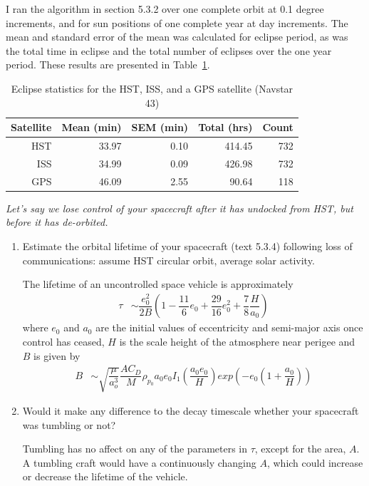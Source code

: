 \documentclass[onecolumn,10pt]{jhwhw}
\begin{document}
I ran the algorithm in section 5.3.2 over one complete orbit at 0.1 degree increments, and for sun positions of one complete year at day increments. The mean and standard error of the mean was calculated for eclipse period, as was the total time in eclipse and the total number of eclipses over the one year period. These results are presented in Table~\ref{p2table}.

\begin{table}[h]
\begin{center}
\begin{tabular}{rrrrr}
\toprule
Satellite & Mean (min) & SEM (min) & Total (hrs) & Count \\
\midrule
HST & 33.97 & 0.10 & 414.45 & 732 \\
ISS & 34.99 & 0.09 & 426.98 & 732 \\
GPS & 46.09 & 2.55 &  90.64 & 118 \\
\bottomrule
\end{tabular}
\end{center}
\caption{Eclipse statistics for the HST, ISS, and a GPS satellite (Navstar 43)}
\label{p2table}
\end{table}

\clearpage

\problem{}
\textit{Let’s say we lose control of your spacecraft after it has undocked from HST, but before it has de-orbited.}
\begin{enumerate}
\itemsep0em
\item Estimate the orbital lifetime of your spacecraft (text 5.3.4) following loss of communications: assume HST circular orbit, average solar activity.

The lifetime of an uncontrolled space vehicle is approximately
\begin{align*}
\tau &\sim \dfrac{e_0^2}{2B} \left( 1 - \dfrac{11}{6}e_0 + \dfrac{29}{16}e_0^2 + \dfrac{7}{8} \dfrac{H}{a_0} \right)
\end{align*}
where $e_0$ and $a_0$ are the initial values of eccentricity and semi-major axis once control has ceased, $H$ is the scale height of the atmosphere near perigee and $B$ is given by
\begin{align*}
B &\sim \sqrt{\dfrac{\mu}{a_o^3}} \dfrac{A C_D}{M} \rho_{p_0} a_0 e_0 I_1 \left( \dfrac{a_0 e_0}{H} \right) exp \left(-e_0 \left(1 + \dfrac{a_0}{H} \right) \right)
\end{align*}

\item Would it make any difference to the decay timescale whether your spacecraft was tumbling or not?

Tumbling has no affect on any of the parameters in $\tau$, except for the area, $A$. A tumbling craft would have a continuously changing $A$, which could increase or decrease the lifetime of the vehicle.
\end{enumerate}
\clearpage
\end{document}
